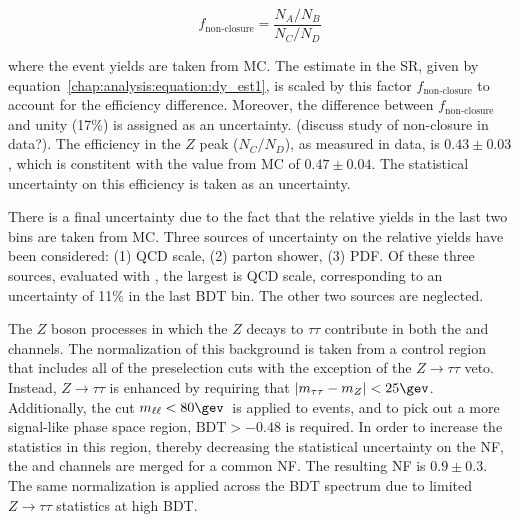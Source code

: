 \begin{equation}
f_{\textrm{non-closure}} = \frac{N_A/N_B}{N_C/N_D}
\label{chap:analysis:equation:abcd_nonclosure}
\end{equation}

\noindent
where the event yields are taken from \ZDY MC. The \ZDY estimate in
the SR, given by equation~\ref{chap:analysis:equation:dy_est1}, is
scaled by this factor $f_{\textrm{non-closure}}$ to account for the
\etmiss efficiency difference. Moreover, the difference between
$f_{\textrm{non-closure}}$ and unity (17\%) is assigned as an
uncertainty. (discuss study of non-closure in data?). The \etmiss
efficiency in the $Z$ peak ($N_C/N_D$), as measured in data, is $0.43
\pm 0.03$, which is constitent with the value from \ZDY MC of $0.47
\pm 0.04$. The statistical uncertainty on this efficiency is taken as
an uncertainty.

There is a final uncertainty due to the fact that the relative yields
in the last two bins are taken from MC. Three sources of uncertainty
on the relative yields have been considered: (1) QCD scale, (2) parton
shower, (3) PDF. Of these three sources, evaluated with \SHERPA, the
largest is QCD scale, corresponding to an uncertainty of 11\% in the
last BDT bin. The other two sources are neglected.

The $Z$ boson processes in which the $Z$ decays to $\tau\tau$
contribute in both the \emme and \eemm channels. The normalization of
this background is taken from a control region that includes all of
the preselection cuts with the exception of the
$Z\rightarrow{\tau\tau}$ veto. Instead, $Z\rightarrow{\tau\tau}$ is
enhanced by requiring that $|\mtt - m_Z| < 25 \gev$. Additionally, the
cut $\mll < 80 \gev$~is applied to \emme events, and to pick out a
more signal-like phase space region, $\textrm{BDT} > -0.48$ is
required. In order to increase the statistics in this region, thereby
decreasing the statistical uncertainty on the NF, the \emme and \eemm
channels are merged for a common NF. The resulting NF is $0.9 \pm
0.3$. The same normalization is applied across the BDT spectrum due to
limited $Z\rightarrow{\tau\tau}$ statistics at high BDT. 

